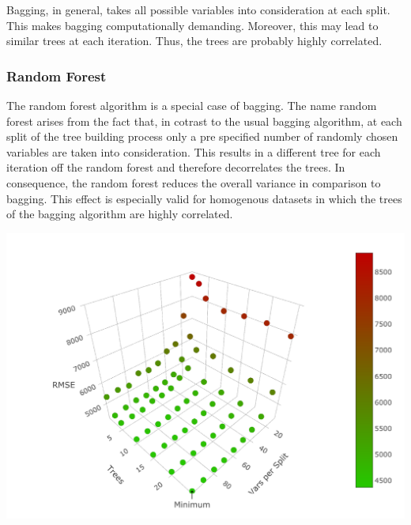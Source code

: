 \documentclass[11pt,]{article}
\let\origfigure\figure
\let\endorigfigure\endfigure
\renewenvironment{figure}[1][2] {
    \expandafter\origfigure\expandafter[H]
} {
    \endorigfigure
}
\begin{document}
Bagging, in general, takes all possible variables into consideration at
each split. This makes \ac{bagging} computationally demanding. Moreover,
this may lead to similar trees at each iteration. Thus, the trees are
probably highly correlated.

\hypertarget{random-forest}{%
\subsubsection{\texorpdfstring{Random Forest
\label{chap:rand_for}}{Random Forest }}\label{random-forest}}

The random forest algorithm is a special case of \ac{bagging}. The name
random forest arises from the fact that, in cotrast to the usual
\ac{bagging} algorithm, at each split of the tree building process only
a pre specified number of randomly chosen variables are taken into
consideration. This results in a different tree for each iteration off
the random forest and therefore decorrelates the trees. In consequence,
the random forest reduces the overall variance in comparison to
\ac{bagging}. This effect is especially valid for homogenous datasets in
which the trees of the \ac{bagging} algorithm are highly correlated.

\begin{figure}

{\centering \includegraphics{../00_data/output_paper/10_rf_plot} 

}

\caption[RMSE's of the Random Forest for Different Parameters]{\label{fig:rfrmse}Random Forest: Dependency between RMSE, the Number of Trees and the Number of Variables Included at each Split.}\label{fig:unnamed-chunk-10}
\end{figure}
\end{document}
